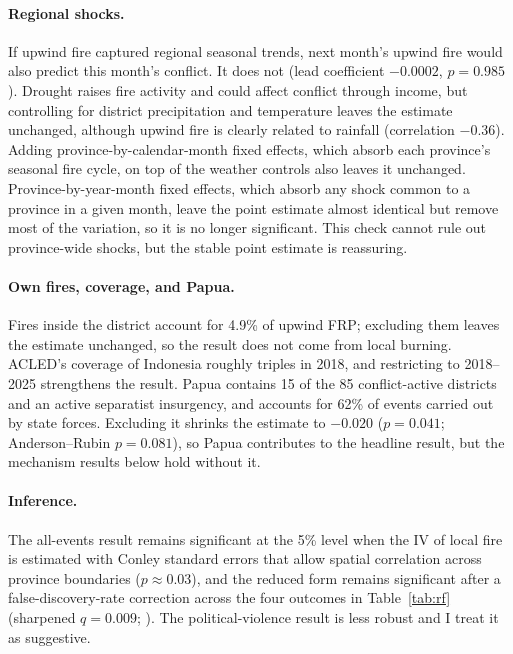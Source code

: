 \documentclass[12pt]{article}
\begin{document}
\paragraph{Regional shocks.} If upwind fire captured regional seasonal trends, next month's upwind fire would also predict this month's conflict. It does not (lead coefficient $-0.0002$, $p=0.985$). Drought raises fire activity and could affect conflict through income, but controlling for district precipitation and temperature leaves the estimate unchanged, although upwind fire is clearly related to rainfall (correlation $-0.36$). Adding province-by-calendar-month fixed effects, which absorb each province's seasonal fire cycle, on top of the weather controls also leaves it unchanged. Province-by-year-month fixed effects, which absorb any shock common to a province in a given month, leave the point estimate almost identical but remove most of the variation, so it is no longer significant. This check cannot rule out province-wide shocks, but the stable point estimate is reassuring.

\paragraph{Own fires, coverage, and Papua.} Fires inside the district account for 4.9\% of upwind FRP; excluding them leaves the estimate unchanged, so the result does not come from local burning. ACLED's coverage of Indonesia roughly triples in 2018, and restricting to 2018--2025 strengthens the result. Papua contains 15 of the 85 conflict-active districts and an active separatist insurgency, and accounts for 62\% of events carried out by state forces. Excluding it shrinks the estimate to $-0.020$ ($p=0.041$; Anderson--Rubin $p=0.081$), so Papua contributes to the headline result, but the mechanism results below hold without it.

\paragraph{Inference.} The all-events result remains significant at the 5\% level when the IV of local fire is estimated with Conley standard errors that allow spatial correlation across province boundaries ($p \approx 0.03$), and the reduced form remains significant after a false-discovery-rate correction across the four outcomes in Table~\ref{tab:rf} (sharpened $q=0.009$; \citealp{anderson2008multiple}). The political-violence result is less robust and I treat it as suggestive.
\end{document}

